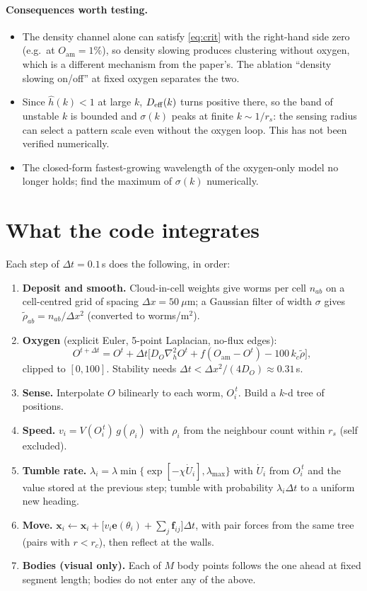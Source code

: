 \documentclass[11pt,a4paper]{article}
\newcommand{\vect}[1]{\bm{#1}}
\newcommand{\Oam}{O_{\mathrm{am}}}
\begin{document}
\paragraph{Consequences worth testing.}
\begin{itemize}
\item The density channel alone can satisfy \eqref{eq:crit} with the right-hand side zero (e.g.\ at $\Oam=1\%$), so density slowing produces clustering without oxygen, which is a different mechanism from the paper's. The ablation ``density slowing on/off'' at fixed oxygen separates the two.
\item Since $\hat h(k)<1$ at large $k$, $D_{\rm eff}(k)$ turns positive there, so the band of unstable $k$ is bounded and $\sigma(k)$ peaks at finite $k\sim1/r_s$: the sensing radius can select a pattern scale even without the oxygen loop. This has not been verified numerically.
\item The closed-form fastest-growing wavelength of the oxygen-only model no longer holds; find the maximum of $\sigma(k)$ numerically.
\end{itemize}

\section{What the code integrates}

Each step of $\Delta t=0.1$\,s does the following, in order:
\begin{enumerate}
\item \textbf{Deposit and smooth.} Cloud-in-cell weights give worms per cell $n_{ab}$ on a cell-centred grid of spacing $\Delta x=50~\mu$m; a Gaussian filter of width $\sigma$ gives $\tilde\rho_{ab}=n_{ab}/\Delta x^2$ (converted to worms/m$^2$).
\item \textbf{Oxygen} (explicit Euler, 5-point Laplacian, no-flux edges):
\begin{equation}
O^{t+\Delta t}=O^t+\Delta t\Big[D_O\nabla_h^2O^t+f(\Oam-O^t)-100\,k_c\tilde\rho\Big],
\end{equation}
clipped to $[0,100]$. Stability needs $\Delta t<\Delta x^2/(4D_O)\approx0.31$\,s.
\item \textbf{Sense.} Interpolate $O$ bilinearly to each worm, $O_i^{\,t}$. Build a $k$-d tree of positions.
\item \textbf{Speed.} $v_i=V(O_i^{\,t})\,g(\rho_i)$ with $\rho_i$ from the neighbour count within $r_s$ (self excluded).
\item \textbf{Tumble rate.} $\lambda_i=\lambda\min\{\exp[-\chi\dot U_i],\lambda_{\max}\}$ with $\dot U_i$ from $O_i^{\,t}$ and the value stored at the previous step; tumble with probability $\lambda_i\Delta t$ to a uniform new heading.
\item \textbf{Move.} $\vect{x}_i\leftarrow\vect{x}_i+\big[v_i\vect{e}(\theta_i)+\sum_j\vect{f}_{ij}\big]\Delta t$, with pair forces from the same tree (pairs with $r<r_c$), then reflect at the walls.
\item \textbf{Bodies (visual only).} Each of $M$ body points follows the one ahead at fixed segment length; bodies do not enter any of the above.
\end{enumerate}
\end{document}
